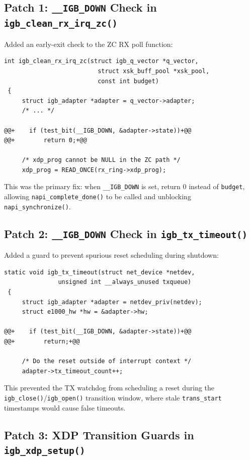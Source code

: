 \documentclass[11pt,a4paper,openany]{book}
\newcommand{\func}[1]{\texttt{#1()}}
\newcommand{\flag}[1]{\texttt{#1}}
\begin{document}
\subsection{Patch 1: \texttt{\_\_IGB\_DOWN} Check in \texttt{igb\_clean\_rx\_irq\_zc()}}

Added an early-exit check to the ZC RX poll function:

\begin{lstlisting}[style=diffstyle]
 int igb_clean_rx_irq_zc(struct igb_q_vector *q_vector,
                          struct xsk_buff_pool *xsk_pool,
                          const int budget)
 {
     struct igb_adapter *adapter = q_vector->adapter;
     /* ... */

@@+    if (test_bit(__IGB_DOWN, &adapter->state))+@@
@@+        return 0;+@@

     /* xdp_prog cannot be NULL in the ZC path */
     xdp_prog = READ_ONCE(rx_ring->xdp_prog);
\end{lstlisting}

This was the primary fix: when \flag{\_\_IGB\_DOWN} is set, return 0
instead of \texttt{budget}, allowing \func{napi\_complete\_done} to be
called and unblocking \func{napi\_synchronize}.

\subsection{Patch 2: \texttt{\_\_IGB\_DOWN} Check in \texttt{igb\_tx\_timeout()}}

Added a guard to prevent spurious reset scheduling during shutdown:

\begin{lstlisting}[style=diffstyle]
 static void igb_tx_timeout(struct net_device *netdev,
               unsigned int __always_unused txqueue)
 {
     struct igb_adapter *adapter = netdev_priv(netdev);
     struct e1000_hw *hw = &adapter->hw;

@@+    if (test_bit(__IGB_DOWN, &adapter->state))+@@
@@+        return;+@@

     /* Do the reset outside of interrupt context */
     adapter->tx_timeout_count++;
\end{lstlisting}

This prevented the TX watchdog from scheduling a reset during the
\func{igb\_close}/\func{igb\_open} transition window, where stale
\texttt{trans\_start} timestamps would cause false timeouts.

\subsection{Patch 3: XDP Transition Guards in \texttt{igb\_xdp\_setup()}}
\end{document}
